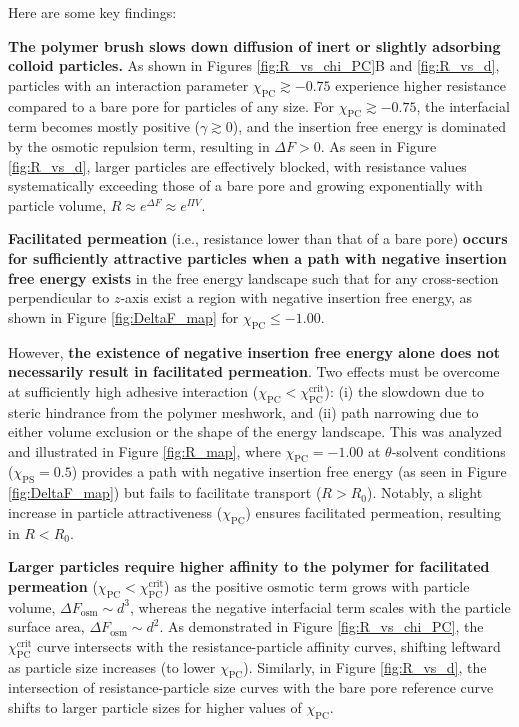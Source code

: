 \documentclass[12pt, a4paper]{article}
\begin{document}
Here are some key findings:

\textbf{The polymer brush slows down diffusion of inert or slightly adsorbing colloid particles.}
As shown in Figures \ref{fig:R_vs_chi_PC}B and \ref{fig:R_vs_d}, particles with an interaction parameter $\chi_{\text{PC}} \gtrsim -0.75$ experience higher resistance compared to a bare pore for particles of any size.
For $\chi_{\text{PC}} \gtrsim -0.75$, the interfacial term becomes mostly positive ($\gamma \gtrsim 0$), and the insertion free energy is dominated by the osmotic repulsion term, resulting in $\Delta F > 0$.
As seen in Figure \ref{fig:R_vs_d}, larger particles are effectively blocked, with resistance values systematically exceeding those of a bare pore and growing exponentially with particle volume, $R \approx e^{\Delta F} \approx e^{\Pi V}$.

\textbf{Facilitated permeation} (i.e., resistance lower than that of a bare pore) \textbf{occurs for sufficiently attractive particles when a path with negative insertion free energy exists} in the free energy landscape such that for any cross-section perpendicular to $z$-axis exist a region with negative insertion free energy,
as shown in Figure \ref{fig:DeltaF_map} for $\chi_{\text{PC}} \le -1.00$.

However, \textbf{the existence of negative insertion free energy alone does not necessarily result in facilitated permeation}.
Two effects must be overcome at sufficiently high adhesive interaction ($\chi_{\text{PC}} < \chi^{\text{crit}}_{\text{PC}}$): (i) the slowdown due to steric hindrance from the polymer meshwork, and (ii) path narrowing due to either volume exclusion or the shape of the energy landscape.
This was analyzed and illustrated in Figure \ref{fig:R_map}, where $\chi_{\text{PC}} = -1.00$ at $\theta$-solvent conditions ($\chi_{\text{PS}} = 0.5$) provides a path with negative insertion free energy (as seen in Figure \ref{fig:DeltaF_map}) but fails to facilitate transport ($R > R_{0}$).
Notably, a slight increase in particle attractiveness ($\chi_{\text{PC}}$) ensures facilitated permeation, resulting in $R < R_{0}$.

\textbf{Larger particles require higher affinity to the polymer for facilitated permeation} ($\chi_{\text{PC}} < \chi^{\text{crit}}_{\text{PC}}$) as the positive osmotic term grows with particle volume, $\Delta F_{\text{osm}} \sim d^3$, whereas the negative interfacial term scales with the particle surface area, $\Delta F_{\text{osm}} \sim d^2$.
As demonstrated in Figure \ref{fig:R_vs_chi_PC}, the $\chi^{\text{crit}}_{\text{PC}}$ curve intersects with the resistance-particle affinity curves, shifting leftward as particle size increases (to lower $\chi_{\text{PC}}$).
Similarly, in Figure \ref{fig:R_vs_d}, the intersection of resistance-particle size curves with the bare pore reference curve shifts to larger particle sizes for higher values of $\chi_{\text{PC}}$.
\end{document}
